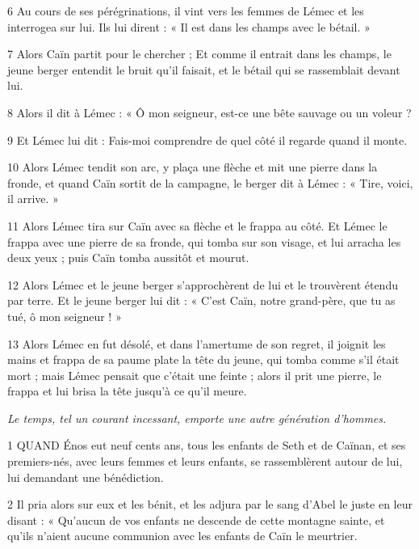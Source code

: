 \par 6 Au cours de ses pérégrinations, il vint vers les femmes de Lémec et les interrogea sur lui. Ils lui dirent : « Il est dans les champs avec le bétail. »

\par 7 Alors Caïn partit pour le chercher ; Et comme il entrait dans les champs, le jeune berger entendit le bruit qu'il faisait, et le bétail qui se rassemblait devant lui.

\par 8 Alors il dit à Lémec : « Ô mon seigneur, est-ce une bête sauvage ou un voleur ?

\par 9 Et Lémec lui dit : Fais-moi comprendre de quel côté il regarde quand il monte.

\par 10 Alors Lémec tendit son arc, y plaça une flèche et mit une pierre dans la fronde, et quand Caïn sortit de la campagne, le berger dit à Lémec : « Tire, voici, il arrive. »

\par 11 Alors Lémec tira sur Caïn avec sa flèche et le frappa au côté. Et Lémec le frappa avec une pierre de sa fronde, qui tomba sur son visage, et lui arracha les deux yeux ; puis Caïn tomba aussitôt et mourut.

\par 12 Alors Lémec et le jeune berger s'approchèrent de lui et le trouvèrent étendu par terre. Et le jeune berger lui dit : « C'est Caïn, notre grand-père, que tu as tué, ô mon seigneur ! »

\par 13 Alors Lémec en fut désolé, et dans l'amertume de son regret, il joignit les mains et frappa de sa paume plate la tête du jeune, qui tomba comme s'il était mort ; mais Lémec pensait que c'était une feinte ; alors il prit une pierre, le frappa et lui brisa la tête jusqu'à ce qu'il meure.


\par \textit{Le temps, tel un courant incessant, emporte une autre génération d'hommes.}

\par 1 QUAND Énos eut neuf cents ans, tous les enfants de Seth et de Caïnan, et ses premiers-nés, avec leurs femmes et leurs enfants, se rassemblèrent autour de lui, lui demandant une bénédiction.

\par 2 Il pria alors sur eux et les bénit, et les adjura par le sang d'Abel le juste en leur disant : « Qu'aucun de vos enfants ne descende de cette montagne sainte, et qu'ils n'aient aucune communion avec les enfants de Caïn le meurtrier.

